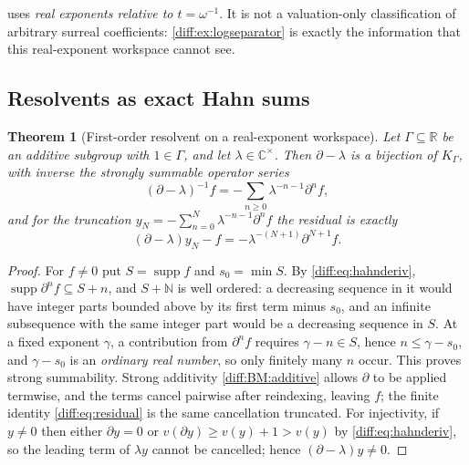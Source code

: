 \documentclass[11pt,letterpaper]{article}
\numberwithin{equation}{section}
\newtheorem{theorem}{Theorem}[section]
\theoremstyle{definition}
\theoremstyle{remark}
\newcommand{\R}{\mathbb R}
\newcommand{\C}{\mathbb C}
\newcommand{\N}{\mathbb N}
\newcommand{\der}{\partial}
\newcommand{\supp}{\operatorname{supp}}
\begin{document}
\begin{warning}
\label{diff:warn:valonly}
 uses \emph{real exponents relative to
$t=\omega^{-1}$}. It is not a valuation-only classification of arbitrary
surreal coefficients: \cref{diff:ex:logseparator} is exactly the information
that this real-exponent workspace cannot see.
\end{warning}

\subsection{Resolvents as exact Hahn sums}
\label{diff:sub:resolvents}

\begin{theorem}[First-order resolvent on a real-exponent workspace]
\label{diff:thm:resolvent}
Let $\Gamma\subseteq\R$ be an additive subgroup with $1\in\Gamma$, and let
$\lambda\in\C^{\times}$. Then $\der-\lambda$ is a bijection of $K_{\Gamma}$,
with inverse the strongly summable operator series
\begin{equation}\label{diff:eq:resolvent}
 (\der-\lambda)^{-1}f=-\sum_{n\geq0}\lambda^{-n-1}\der^{n}f ,
\end{equation}
and for the truncation
$y_{N}=-\sum_{n=0}^{N}\lambda^{-n-1}\der^{n}f$ the residual is exactly
\begin{equation}\label{diff:eq:residual}
 (\der-\lambda)y_{N}-f=-\lambda^{-(N+1)}\der^{N+1}f .
\end{equation}
\end{theorem}
\begin{proof}
For $f\neq0$ put $S=\supp f$ and $s_{0}=\min S$. By
\cref{diff:eq:hahnderiv}, $\supp\der^{n}f\subseteq S+n$, and $S+\N$ is well
ordered: a decreasing sequence in it would have integer parts bounded above by
its first term minus $s_{0}$, and an infinite subsequence with the same
integer part would be a decreasing sequence in $S$. At a fixed exponent
$\gamma$, a contribution from $\der^{n}f$ requires $\gamma-n\in S$, hence
$n\leq\gamma-s_{0}$, and $\gamma-s_{0}$ is an \emph{ordinary real number}, so
only finitely many $n$ occur. This proves strong summability. Strong
additivity \ref{diff:BM:additive} allows $\der$ to be applied termwise, and
the terms cancel pairwise after reindexing, leaving $f$; the finite identity
\cref{diff:eq:residual} is the same cancellation truncated. For injectivity,
if $y\neq0$ then either $\der y=0$ or $v(\der y)\geq v(y)+1>v(y)$ by
\cref{diff:eq:hahnderiv}, so the leading term of $\lambda y$ cannot be
cancelled; hence $(\der-\lambda)y\neq0$.
\end{proof}
\end{document}
